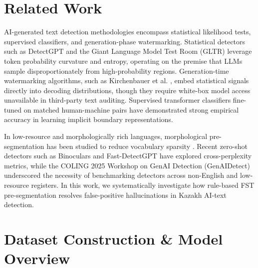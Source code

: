 \documentclass[runningheads]{llncs}
\begin{document}
\section{Related Work}
AI-generated text detection methodologies encompass statistical likelihood tests, supervised classifiers, and generation-phase watermarking. Statistical detectors such as DetectGPT \cite{7} and the Giant Language Model Test Room (GLTR) \cite{8} leverage token probability curvature and entropy, operating on the premise that LLMs sample disproportionately from high-probability regions. Generation-time watermarking algorithms, such as Kirchenbauer et al. \cite{9}, embed statistical signals directly into decoding distributions, though they require white-box model access unavailable in third-party text auditing. Supervised transformer classifiers fine-tuned on matched human-machine pairs \cite{10} have demonstrated strong empirical accuracy in learning implicit boundary representations.

In low-resource and morphologically rich languages, morphological pre-segmentation has been studied to reduce vocabulary sparsity \cite{11}. Recent zero-shot detectors such as Binoculars \cite{12} and Fast-DetectGPT \cite{13} have explored cross-perplexity metrics, while the COLING 2025 Workshop on GenAI Detection (GenAIDetect) \cite{14} underscored the necessity of benchmarking detectors across non-English and low-resource registers. In this work, we systematically investigate how rule-based FST pre-segmentation resolves false-positive hallucinations in Kazakh AI-text detection.

\section{Dataset Construction \& Model Overview}
\end{document}
